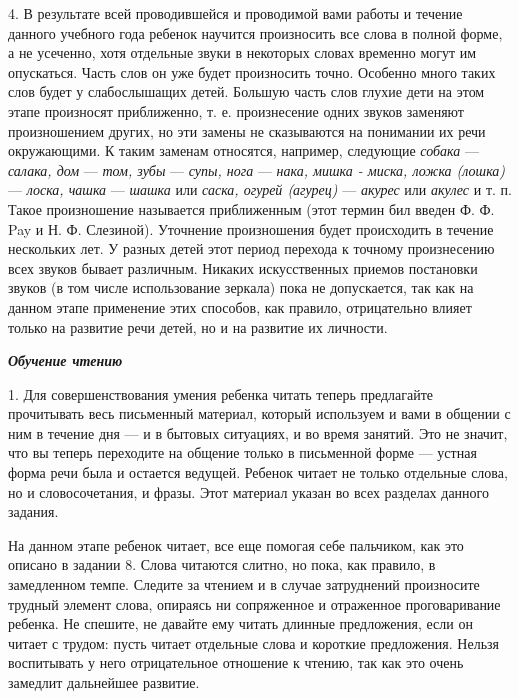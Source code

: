 \documentclass[a5paper]{book}
\renewcommand{\emph}[1]{\textit{#1}}
\begin{document}
4. В результате всей проводившейся и проводимой вами работы и течение
данного учебного года ребенок научится произносить все слова в полной
форме, а не усеченно, хотя отдельные звуки в некоторых словах временно
могут им опускаться. Часть слов он уже будет произносить точно. Особенно
много таких слов будет у слабослышащих детей. Большую часть слов глухие
дети на этом этапе произносят приближенно, т. е. произнесение одних
звуков заменяют произношением других, но эти замены не сказываются на
понимании их речи окружающими. К таким заменам относятся, например,
следующие \emph{собака} --- \emph{салака, дом} --- \emph{том, зубы} ---
\emph{супы, нога} --- \emph{нака, мишка - миска, ложка (лошка)} ---
\emph{лоска, чашка} --- \emph{шашка} или \emph{саска, огурей (агурец)}
--- \emph{акурес} или \emph{акулес} и т. п. Такое произношение
называется приближенным (этот термин бил введен Ф. Ф. Pay и Н. Ф.
Слезиной). Уточнение произношения будет происходить в течение нескольких
лет. У разных детей этот период перехода к точному произнесению всех
звуков бывает различным. Никаких искусственных приемов постановки звуков
(в том числе использование зеркала) пока не допускается, так как на
данном этапе применение этих способов, как правило, отрицательно влияет
только на развитие речи детей, но и на развитие их личности.

\emph{\textbf{Обучение чтению}}

1. Для совершенствования умения ребенка читать теперь предлагайте
прочитывать весь письменный материал, который используем и вами в
общении с ним в течение дня --- и в бытовых ситуациях, и во время
занятий. Это не значит, что вы теперь переходите на общение только в
письменной форме --- устная форма речи была и остается ведущей. Ребенок
читает не только отдельные слова, но и словосочетания, и фразы. Этот
материал указан во всех разделах данного задания.

На данном этапе ребенок читает, все еще помогая себе пальчиком, как это
описано в задании 8. Слова читаются слитно, но пока, как правило, в
замедленном темпе. Следите за чтением и в случае затруднений произносите
трудный элемент слова, опираясь ни сопряженное и отраженное
проговаривание ребенка. Не спешите, не давайте ему читать длинные
предложения, если он читает с трудом: пусть читает отдельные слова и
короткие предложения. Нельзя воспитывать у него отрицательное отношение
к чтению, так как это очень замедлит дальнейшее развитие.
\end{document}
